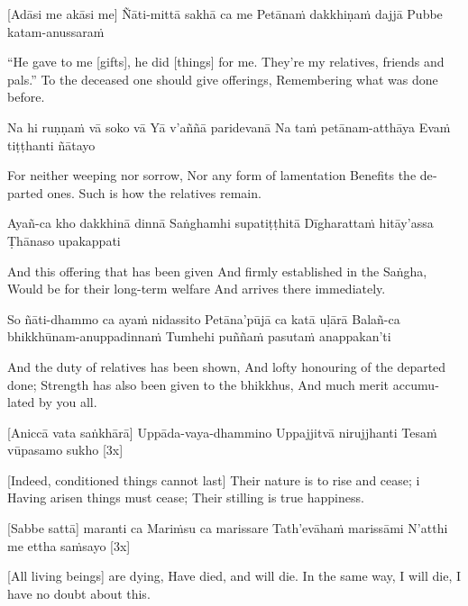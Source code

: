\suttaRef{[Dhs A]}

[Adāsi me akāsi me]
Ñāti-mittā sakhā ca me
Petānaṁ dakkhiṇaṁ dajjā
Pubbe katam-anussaraṁ

\begin{english}
  “He gave to me [gifts], he did [things] for me.
  They're my relatives, friends and pals.”
  To the deceased one should give offerings,
  Remembering what was done before.
\end{english}

Na hi ruṇṇaṁ vā soko vā
Yā v’aññā paridevanā
Na taṁ petānam-atthāya
Evaṁ tiṭṭhanti ñātayo

\begin{english}
  For neither weeping nor sorrow,
  Nor any form of lamentation
  Benefits the departed ones.
  Such is how the relatives remain.
\end{english}

Ayañ-ca kho dakkhinā dinnā
Saṅghamhi supatiṭṭhitā
Dīgharattaṁ hitāy’assa
Ṭhānaso upakappati

\begin{english}
  And this offering that has been given
  And firmly established in the Saṅgha,
  Would be for their long-term welfare
  And arrives there immediately.
\end{english}

So ñāti-dhammo ca ayaṁ nidassito
Petāna’pūjā ca katā uḷārā
Balañ-ca bhikkhūnam-anuppadinnaṁ
Tumhehi puññaṁ pasutaṁ anappakan’ti

\begin{english}
  And the duty of relatives has been shown,
  And lofty honouring of the departed done;
  Strength has also been given to the bhikkhus,
  And much merit accumulated by you all.
\end{english}

\suttaRef{[Khp 7]}

[Aniccā vata saṅkhārā]
Uppāda-vaya-dhammino
Uppajjitvā nirujjhanti
Tesaṁ vūpasamo sukho [3x]

\begin{english}
  [Indeed, conditioned things cannot last]
  Their nature is to rise and cease; i
  Having arisen things must cease;
  Their stilling is true happiness.
\end{english}

\suttaRef{[DN 16]}

[Sabbe sattā] maranti ca
Mariṁsu ca marissare
Tath’evāhaṁ marissāmi
N’atthi me ettha saṁsayo [3x]

\begin{english}
  [All living beings] are dying,
  Have died, and will die.
  In the same way, I will die,
  I have no doubt about this.
\end{english}

